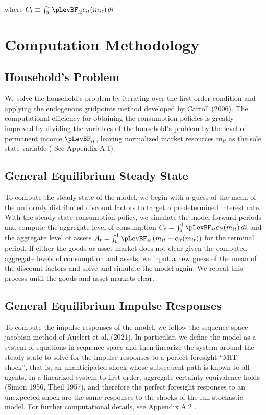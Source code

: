 \documentclass[titlepage]{\econtex}\providecommand{\texname}{BufferStockTheory}
\begin{document}
 where $C_{t} \equiv  \int_{0}^{1} \pLevBF_{it} c_{it}(m_{it})\, di $


\hypertarget{Computational Methodology}{}
\section{Computation Methodology}

\hypertarget{Household's Problem}{}
\subsection{Household's Problem}

We solve the household's problem by iterating over the first order condition and applying the endogenous gridpoints method developed by Carroll (2006). The computational efficiency for obtaining the consumption policies is greatly improved by dividing the variables of the household's problem by the level of permanent income $\pLevBF_{it}$, leaving normalized market resources $m_{it}$ as the sole state variable ( See Appendix  A.1).  

\hypertarget{General Equilibrium Steady State}{}
\subsection{General Equilibrium Steady State}

To compute the steady state of the model, we begin with a guess of the mean of the uniformly distributed discount factors to target a predetermined interest rate.  With the steady state consumption policy, we simulate the model forward periods and compute the aggregate level of consumption $ C_{t} =  \int_{0}^{1} \pLevBF_{it} c_{it}(m_{it})\, di$  and the aggregate level of assets $ A_{t} = \int_{0}^{1} \pLevBF_{it} \left( m_{it} -  c_{it}(m_{it}) \right)$ for the terminal period. If either the goods or asset market does not clear given the computed aggregate levels of consumption and assets,  we input a new guess of the mean of the discount factors and solve and simulate the model again. We repeat this process until the goods and asset markets clear.  


\hypertarget{General Equilibrium Impulse Responses}{}
\subsection{General Equilibrium Impulse Responses}

To compute the impulse responses of the model, we follow the sequence space jacobian method of Auclert et al. (2021). In particular, we define the model as a system of equations in sequence space and then linearize the system around the steady state to solve for the impulse responses to a perfect foresight ``MIT shock'', that is, an unanticipated shock whose subsequent path is known to all agents.  In a linearized system to first order, aggregate certainty equivalence holds (Simon 1956, Theil 1957),  and therefore the perfect foresight responses to an unexpected shock are the same responses to the shocks of the full stochastic model. For further computational details, see Appendix A.2 . 
\end{document}

